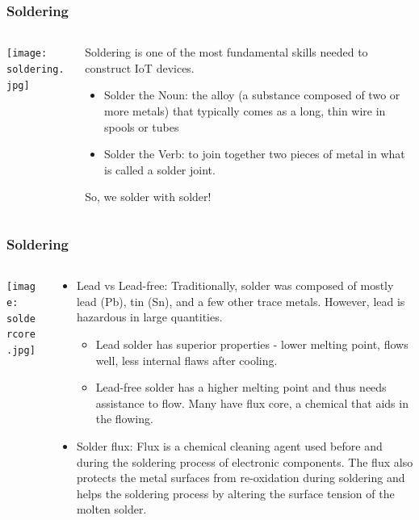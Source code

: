\documentclass{beamer}
\begin{document}
\begin{frame}\frametitle{Soldering}
\begin{columns}
\begin{column}{4cm}
\texttt{[image: soldering.jpg]}
\end{column}
\begin{column}{7.5cm}
Soldering is one of the most fundamental skills needed to construct IoT devices.
\begin{itemize}
\item Solder the Noun: the alloy (a substance composed of two or more metals) that typically comes as a long, thin wire in spools or tubes
\item Solder the Verb: to join together two pieces of metal in what is called a solder joint.
\end{itemize}
So, we solder with solder!
\end{column}
\end{columns}
\end{frame}

\begin{frame}\frametitle{Soldering}
\begin{columns}
\begin{column}{2cm}
\begin{center}
\texttt{[image: soldercore.jpg]}
\end{center}
\end{column}
\begin{column}{9.5cm}
\begin{itemize}
\item Lead vs Lead-free: Traditionally, solder was composed of mostly lead (Pb), tin (Sn), and a few other trace metals. However, lead is hazardous in large quantities.
	\begin{itemize}
	\item Lead solder has superior properties - lower melting point, flows well, less internal flaws after cooling.
	\item Lead-free solder has a higher melting point and thus needs assistance to flow. Many have flux core, a chemical that aids in the flowing.
	\end{itemize}
\item Solder flux: Flux is a chemical cleaning agent used before and during the soldering process of electronic components. The flux also protects the metal surfaces from re-oxidation during soldering and helps the soldering process by altering the surface tension of the molten solder.

\end{itemize}
\end{column}
\end{columns}
\end{frame}
\end{document}
